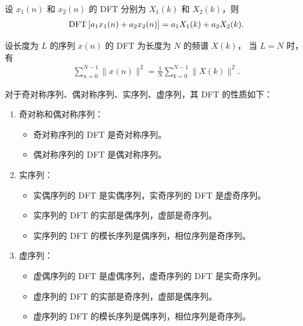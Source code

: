 \begin{property}
    设 $x_1(n)$ 和 $x_2(n)$ 的 DFT 分别为 $X_1(k)$ 和 $X_2(k)$，则
    \begin{align*}
        \mathrm{DFT}\left[a_1x_1(n) + a_2x_2(n)\right] = a_1X_1(k) + a_2X_2(k).
    \end{align*}
\end{property}

\begin{property}
    设长度为 $L$ 的序列 $x(n)$ 的 DFT 为长度为 $N$ 的频谱 $X(k)$，
    当 $L = N$ 时，有
    \begin{align*}
        \sum_{n = 0}^{N - 1}\|x(n)\|^2 = \frac{1}{N}\sum_{k = 0}^{N - 1}\|X(k)\|^2.
    \end{align*}
\end{property}

\begin{property}
    对于奇对称序列、偶对称序列、实序列、虚序列，其 DFT 的性质如下：
    \begin{enumerate}
        \item 奇对称和偶对称序列：
            \begin{itemize}
                \item 奇对称序列的 DFT 是奇对称序列。
                \item 偶对称序列的 DFT 是偶对称序列。
            \end{itemize}
        \item 实序列：
            \begin{itemize}
                \item 实偶序列的 DFT 是实偶序列，实奇序列的 DFT 是虚奇序列。
                \item 实序列的 DFT 的实部是偶序列，虚部是奇序列。
                \item 实序列的 DFT 的模长序列是偶序列，相位序列是奇序列。
            \end{itemize}
        \item 虚序列：
            \begin{itemize}
                \item 虚偶序列的 DFT 是虚偶序列，虚奇序列的 DFT 是实奇序列。
                \item 虚序列的 DFT 的实部是奇序列，虚部是偶序列。
                \item 虚序列的 DFT 的模长序列是偶序列，相位序列是奇序列。
            \end{itemize}
    \end{enumerate}
\end{property}

